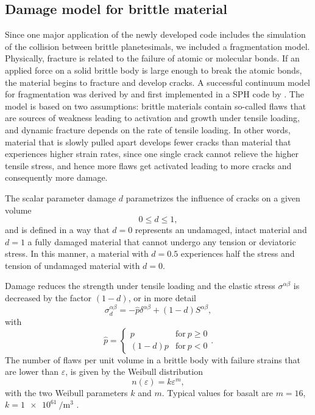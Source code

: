 \documentclass[10pt,fleqn,twoside]{article}
\begin{document}
\subsection{Damage model for brittle material}
\label{section:damage_model}
Since one major application of the newly developed code includes the simulation of the collision between
brittle planetesimals, we included a fragmentation model. Physically, fracture is related to the
failure of atomic or molecular bonds. If an applied force on a solid brittle body is large enough to break the atomic
bonds, the material begins to fracture and develop cracks. A successful continuum model for fragmentation was
derived by \cite{grady:1980} and first implemented in a SPH code by \cite{benz:1995}. The model is based on
two assumptions: brittle materials contain so-called flaws that are sources of weakness leading to activation and
growth under tensile loading, and dynamic fracture depends on the rate of tensile loading. In other words, material that
is slowly pulled apart develops fewer cracks than material that experiences higher strain rates, since one single
crack cannot relieve the higher tensile stress, and hence more flaws get activated leading to more cracks and
consequently more damage.

The scalar parameter damage $d$ parametrizes the influence of cracks on a given volume
\begin{equation}
0 \leq d \leq 1,
\end{equation}
and is defined in a way that $d=0$ represents an undamaged, intact material and $d=1$ a fully damaged material that
cannot undergo any tension or deviatoric stress. In this manner, a material with $d=0.5$ experiences half the stress and
tension of undamaged material with $d=0$.


Damage reduces the strength under tensile loading and the elastic stress $\sigma^{\alpha \beta}$ is decreased
by the factor $(1-d)$, or in more detail
%
\begin{equation}
\sigma^{\alpha \beta}_d = -\hat{p} \delta^{\alpha \beta} + (1-d) S^{\alpha \beta},
\end{equation}
with
\begin{equation}
\hat{p} = \left\{ \begin{array}{ll} p &  \mathrm{for} \ p \geq 0 \\
  (1-d) p &   \mathrm{for} \ p < 0 \end{array} \right. .
\end{equation}
%
The number of flaws per unit volume in a brittle body with failure strains that are lower than $\varepsilon$, is given by
the Weibull distribution \citep{weibull:1939}
%
\begin{equation}
n(\varepsilon) = k \varepsilon^m,
\end{equation}
with the two Weibull parameters $k$ and $m$. Typical values for basalt are $m=16$, $k=\SI{1e61}{\per
\cubic\metre}$ \citep{2007JGRE..112.2001N}.
\end{document}
